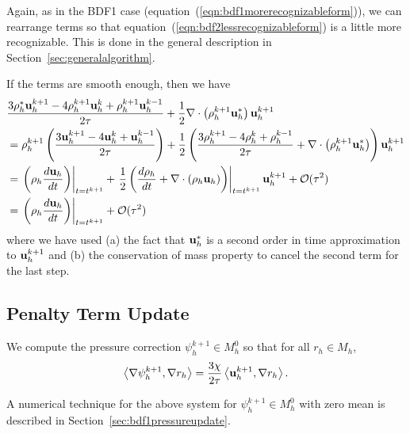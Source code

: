 \documentclass[letterpaper]{erdc}
\begin{document}
\begin{remark}
Again, as in the BDF1 case (equation~(\ref{eqn:bdf1morerecognizableform})), we can rearrange terms so that equation~(\ref{eqn:bdf2lessrecognizableform}) is a little more recognizable.  This is done in the general description in Section~\ref{sec:generalalgorithm}.
\end{remark}

\begin{remark}
If the terms are smooth enough, then we have
\begin{align}
  &\frac{3\rho_h^{*}\textbf{u}_h^{k+1}-4\rho_h^{k+1}\textbf{u}_h^{k} +\rho_h^{k+1}\textbf{u}_h^{k-1}}{2\tau} +\frac{1}{2}\nabla\cdot\left(\rho_h^{k+1}\textbf{u}_h^{*}\right)\textbf{u}_h^{k+1}\\
   &= \rho_h^{k+1}\left(\frac{3\textbf{u}_h^{k+1} - 4\textbf{u}_h^{k} + \textbf{u}_h^{k-1}}{2\tau}\right) + \frac{1}{2} \left( \frac{3\rho_h^{k+1} -4\rho_h^{k} + \rho_h^{k-1}}{2\tau} + \nabla\cdot\left(\rho_h^{k+1}\textbf{u}_h^{*}\right)\right)\textbf{u}_h^{k+1}\\
  &= \left.\left(\rho_h\frac{d\textbf{u}_h}{dt} \right)\right|_{t=t^{k+1}} + \left.\frac{1}{2} \left( \frac{d\rho_h}{dt} +\nabla\cdot\left(\rho_h\textbf{u}_h\right)\right)\right|_{t=t^{k+1}}\textbf{u}_h^{k+1} + \mathcal{O}(\tau^2)\\
  &=\left.\left(\rho_h\frac{d\textbf{u}_h}{dt} \right)\right|_{t=t^{k+1}} + \mathcal{O}(\tau^{2})
\end{align}
where we have used (a) the fact that $\textbf{u}_h^{*}$ is a second order in time approximation to $\textbf{u}_h^{k+1}$ and (b) the conservation of mass property to cancel the second term for the last step.
\end{remark}




%
%
\subsection{Penalty Term Update}
We compute the pressure correction $\psi_h^{k+1}\in M^0_h$ so that for all $r_h\in M_h$,
\begin{equation}
  \left\langle \nabla\psi_h^{k+1}, \nabla r_h \right\rangle = \frac{3\chi}{2\tau}\left\langle \textbf{u}_h^{k+1}, \nabla r_h \right\rangle.
\end{equation}

\begin{remark}
  A numerical technique for the above system for $\psi_h^{k+1}\in M_h^0$ with zero mean is described in Section~\ref{sec:bdf1pressureupdate}.
\end{remark}

%
%
\end{document}
